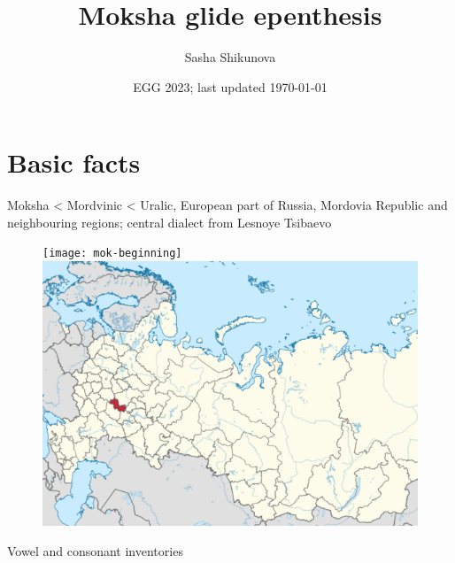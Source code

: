 \documentclass[a4paper, 12pt]{article}
\title{Moksha glide epenthesis}
\author{Sasha Shikunova}
\date{EGG 2023; last updated \today}
\begin{document}
\maketitle

	\section{Basic facts}
	
	Moksha < Mordvinic < Uralic, European part of Russia, Mordovia Republic and neighbouring regions; central dialect from Lesnoye Tsibaevo
	
	\begin{figure}[H]
		\centering
		\texttt{[image: mok-beginning]}
		\hfill
		\includegraphics[scale=.373]{mok-map}
	\end{figure}
	
	\noindent Vowel and consonant inventories \parencite{kukhto2018}
	
\end{document}
